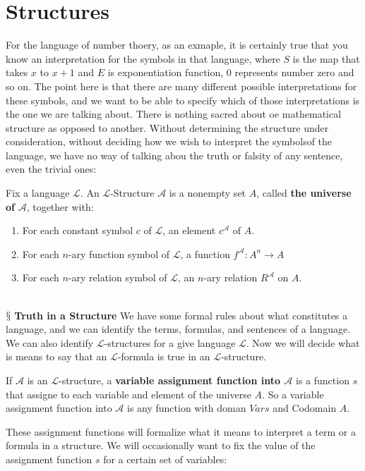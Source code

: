 \documentclass[9pt,a4paper, twocolumn]{article}
\newcommand{\newpoint}[1]{\ \\ \indent$\mathsection$ \textbf{#1}}
\newcommand{\curveL}{\mathcal{L}}
\newcommand{\curveA}{\mathcal{A}}
\begin{document}
    \section*{Structures}
        For the language of number thoery, as an exmaple, it is certainly true that you know an interpretation for the symbols in that language, where $S$ is the map that takes $x$ to $x+1$ and $E$ is exponentiation function, 0 represents number zero and so on. The point here is that there are many different possible interpretations for these symbols, and we want to be able to specify which of those interpretations is the one we are talking about. There is nothing sacred about oe mathematical structure as opposed to another. Without determining the structure under consideration, without deciding how we wish to interpret the symbolsof the language, we have no way of talking abou the truth or falsity of any sentence, even the trivial ones:
        \begin{define}
            Fix a language $\curveL$. An $\curveL$-Structure $\curveA$ is a nonempty set $A$, called \textbf{the universe of} $\curveA$, together with:
            \begin{enumerate}
                \item For each constant symbol $c$ of $\curveL$, an element $c^\curveA$ of $A$.
                \item For each $n$-ary function symbol of $\curveL$, a function $f^\curveA: A^n \rightarrow A$
                \item For each $n$-ary relation symbol of $\curveL$, an $n$-ary relation $R^\curveA$ on $A$.
            \end{enumerate}
        \end{define}
        \newpoint{Truth in a Structure}
            We have some formal rules about what constitutes a language, and we can identify the terms, formulas, and sentences of a language. We can also identify $\curveL$-structures for a give language $\curveL$. Now we will decide what is means to say that an $\curveL$-formula is true in an $\curveL$-structure.
            \begin{define}
                If $\curveA$ is an $\curveL$-structure, a \textbf{variable assignment function into $\curveA$} is a function $s$ that assigne to each variable and element of the universe $A$. So a variable assignment function into $\curveA$ is any function with doman $Vars$ and Codomain $A$.
            \end{define}
            These assignment functions will formalize what it means to interpret a term or a formula in a structure. We will occasionally want to fix the value of the assignment function $s$ for a certain set of variables:
\end{document}
